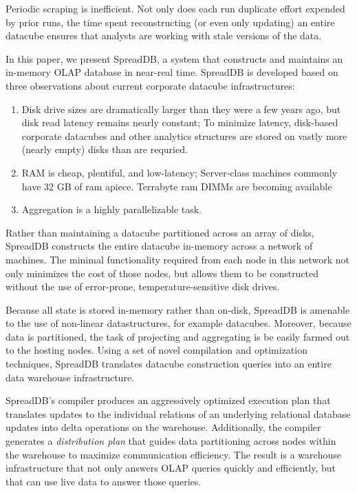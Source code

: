 \documentclass{sig-alternate}
\begin{document}
Periodic scraping is inefficient.  Not only does each run duplicate effort expended by prior runs, the time spent reconstructing (or even only updating) an entire datacube ensures that analysts are working with stale versions of the data.  

In this paper, we present SpreadDB, a system that constructs and maintains an in-memory OLAP database in near-real time.  SpreadDB is developed based on three observations about current corporate datacube infrastructures:
\begin{enumerate}
\item Disk drive sizes are dramatically larger than they were a few years ago, but disk read latency remains nearly constant\cite{}; To minimize latency, disk-based corporate datacubes and other analytics structures are stored on vastly more (nearly empty) disks than are requried.\cite{}
\item RAM is cheap, plentiful, and low-latency; Server-class machines commonly have 32 GB of ram apiece\cite{}.  Terrabyte ram DIMMs are becoming available\cite{}
\item Aggregation is a highly parallelizable task.
\end{enumerate}

Rather than maintaining a datacube partitioned across an array of disks, SpreadDB constructs the entire datacube in-memory across a network of machines.  The minimal functionality required from each node in this network not only minimizes the cost of those nodes, but allows them to be constructed without the use of error-prone, temperature-sensitive disk drives.  

Because all state is stored in-memory rather than on-disk, SpreadDB is amenable to the use of non-linear datastructures, for example datacubes.  Moreover, because data is partitioned, the task of projecting and aggregating is be easily farmed out to the hosting nodes.  Using a set of novel compilation and optimization techniques, SpreadDB translates datacube construction queries into an entire data warehouse infrastructure.  

SpreadDB's compiler produces an aggressively optimized execution plan that translates updates to the individual relations of an underlying relational database updates into delta operations on the warehouse.  Additionally, the compiler generates a \textit{distribution plan} that guides data partitioning across nodes within the warehouse to maximize communication efficiency.  The result is a warehouse infrastructure that not only answers OLAP queries quickly and efficiently, but that can use live data to answer those queries.
\end{document}
